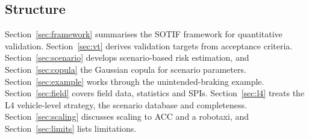\documentclass[11pt,a4paper]{article}
\begin{document}
\subsection{Structure}
Section~\ref{sec:framework} summarises the SOTIF framework for quantitative validation. Section~\ref{sec:vt} derives validation targets from acceptance criteria. Section~\ref{sec:scenario} develops scenario-based risk estimation, and Section~\ref{sec:copula} the Gaussian copula for scenario parameters. Section~\ref{sec:example} works through the unintended-braking example. Section~\ref{sec:field} covers field data, statistics and SPIs. Section~\ref{sec:l4} treats the L4 vehicle-level strategy, the scenario database and completeness. Section~\ref{sec:scaling} discusses scaling to ACC and a robotaxi, and Section~\ref{sec:limits} lists limitations.

\end{document}
